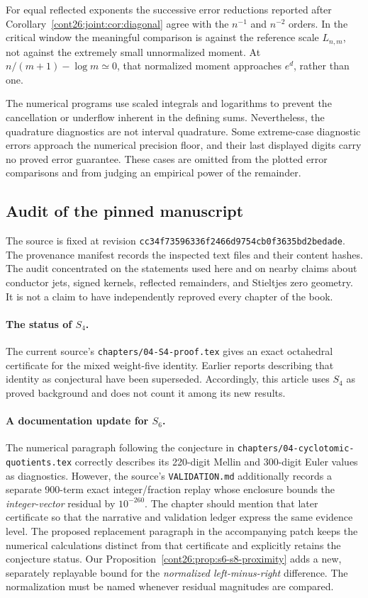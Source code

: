 \documentclass[11pt,letterpaper]{article}
\numberwithin{equation}{section}
\theoremstyle{plain}
\theoremstyle{definition}
\theoremstyle{remark}
\newcommand{\src}[1]{\nolinkurl{#1}}
\begin{document}
For equal reflected exponents the successive error reductions reported
after Corollary~\ref{cont26:joint:cor:diagonal} agree with the $n^{-1}$ and
$n^{-2}$ orders. In the critical window the meaningful comparison is
against the reference scale $L_{n,m}$, not against the extremely small
unnormalized moment. At $n/(m+1)-\log m\simeq0$, that normalized moment
approaches $e^d$, rather than one.

The numerical programs use scaled integrals and logarithms to prevent
the cancellation or underflow inherent in the defining sums.
Nevertheless, the quadrature diagnostics are not interval quadrature.
Some extreme-case diagnostic errors approach the numerical precision
floor, and their last displayed digits carry no proved error guarantee.
These cases are omitted from the plotted error comparisons and from
judging an empirical power of the remainder.

\subsection{Audit of the pinned manuscript}

The source is fixed at revision
\src{cc34f73596336f2466d9754cb0f3635bd2bedade}.
The provenance manifest records the inspected text files and their
content hashes. The audit concentrated on the statements used here
and on nearby claims about conductor jets, signed kernels, reflected
remainders, and Stieltjes zero geometry. It is not a claim to have
independently reproved every chapter of the book.

\paragraph{The status of $S_4$.}
The current source's \src{chapters/04-S4-proof.tex} gives an exact
octahedral certificate for the mixed weight-five identity. Earlier
reports describing that identity as conjectural have been superseded.
Accordingly, this article uses $S_4$ as proved background and does
not count it among its new results.

\paragraph{A documentation update for $S_6$.}
The numerical paragraph following the conjecture in
\src{chapters/04-cyclotomic-quotients.tex} correctly describes its
220-digit Mellin and 300-digit Euler values as diagnostics. However,
the source's \src{VALIDATION.md} additionally records a separate
900-term exact integer/fraction replay whose enclosure bounds the
\emph{integer-vector} residual by $10^{-260}$.
The chapter should mention that later certificate so that the
narrative and validation ledger express the same evidence level.
The proposed replacement paragraph in the accompanying patch keeps
the numerical calculations distinct from that certificate and
explicitly retains the conjecture status. Our
Proposition~\ref{cont26:prop:s6-s8-proximity} adds a new, separately replayable
bound for the \emph{normalized left-minus-right} difference.
The normalization must be named whenever residual magnitudes are
compared.
\end{document}
